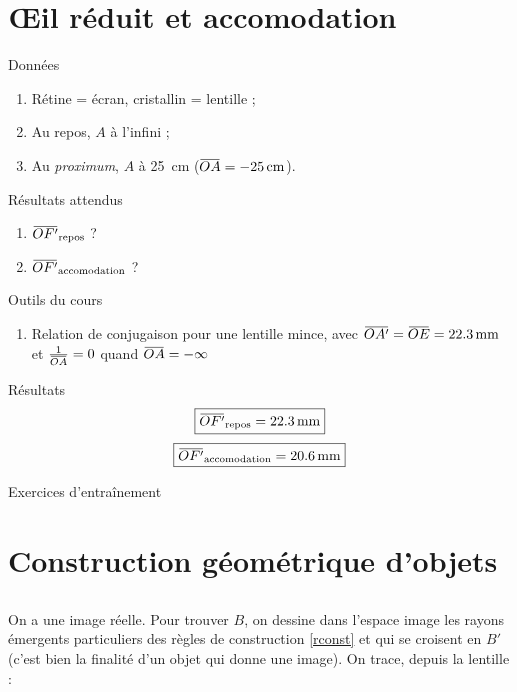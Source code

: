 \documentclass[10pt,a5paper,notitlepage]{book}
\begin{document}
\section{Œil réduit et accomodation}
\begin{NCdefi}{Données}
    \begin{enumerate}
        \item Rétine = écran, cristallin = lentille ;
        \item Au repos, $A$ à l'infini ;
        \item Au \textit{proximum}, $A$ à \SI{25}{cm} ($\OA = \SI{-25}{cm}$).
    \end{enumerate}
\end{NCdefi}

\begin{NCprop}{Résultats attendus}
    \begin{enumerate}
        \item $\OF \St{repos}$ ?
        \item $\OF \St{accomodation}$ ?
    \end{enumerate}
\end{NCprop}

\begin{NCdemo}{Outils du cours}
   \begin{enumerate}
       \item Relation de conjugaison pour une lentille mince, avec $\OAp =
           \obar{OE} = \SI{22.3}{mm} $ et $\frac{1}{\OA} = 0$ quand $\OA =
           -\infty$
   \end{enumerate} 
\end{NCdemo}

\begin{NCexem}{Résultats}
    \[ \boxed{\OF\St{repos} = \SI{22.3}{mm}}\]
    \[ \boxed{\OF\St{accomodation} = \SI{20.6}{mm}} \]
\end{NCexem}

\begin{center}
    \Huge Exercices d'entraînement
\end{center}

\section{Construction géométrique d'objets}
\subsection{}
On a une image réelle. Pour trouver $B$, on dessine dans l'espace image les
rayons émergents particuliers des règles de construction \ref{rconst} et qui se
croisent en $B'$ (c'est bien la finalité d'un objet qui donne une image). On
trace, depuis la lentille :
\end{document}
